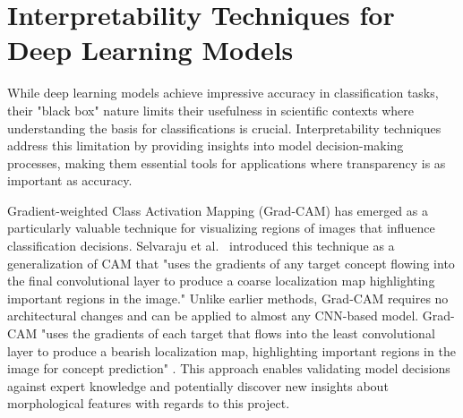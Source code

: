 \documentclass[a4paper,12pt]{report}
\begin{document}














\section*{Interpretability Techniques for Deep Learning Models}
While deep learning models achieve impressive accuracy in classification tasks, their "black box" nature limits their usefulness in scientific contexts where understanding the basis for classifications is crucial. Interpretability techniques address this limitation by providing insights into model decision-making processes, making them essential tools for applications where transparency is as important as accuracy.

Gradient-weighted Class Activation Mapping (Grad-CAM) has emerged as a particularly valuable technique for visualizing regions of images that influence classification decisions. Selvaraju et al.\ \citep{Selvaraju_2019} introduced this technique as a generalization of CAM that "uses the gradients of any target concept flowing into the final convolutional layer to produce a coarse localization map highlighting important regions in the image." Unlike earlier methods, Grad-CAM requires no architectural changes and can be applied to almost any CNN-based model. Grad-CAM "uses the gradients of each target that flows into the least convolutional layer to produce a bearish localization map, highlighting important regions in the image for concept prediction" \citep{Hasibuan2023Large}. This approach enables validating model decisions against expert knowledge and potentially discover new insights about morphological features with regards to this project.
\end{document}
